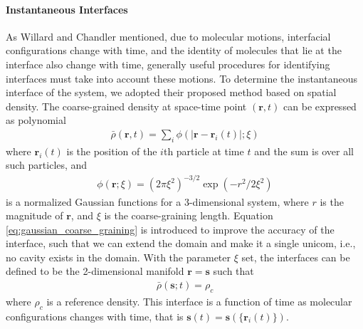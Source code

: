 \paragraph{Instantaneous Interfaces}\label{para:II}
As Willard and Chandler mentioned, due to molecular motions, interfacial configurations
change with time, and the identity of molecules that lie at the interface also change with time, generally useful procedures for
identifying interfaces must take into account these motions. \cite{Willard2010} 
To determine the instantaneous interface of the system, we adopted their proposed method based on spatial density.
The coarse-grained density at space-time point $(\mathbf{r},t)$ can be expressed as polynomial
\begin{eqnarray}
\bar{\rho}(\mathbf{r}, t)=\sum_{i} \phi(|\mathbf{r}-\mathbf{r}_{i}(t)|; \xi) 
\end{eqnarray}
where ${\mathbf{r}}_i(t)$ is the position of the $i$th particle at time $t$ and the sum is over all such particles, and 
\begin{eqnarray}
\phi(\mathbf{r};\xi)=(2 \pi \xi^{2})^{-3/ 2} \exp (-r^{2} / 2 \xi^{2}) 
\label{eq:gaussian_coarse_graining}
\end{eqnarray} 
is a normalized Gaussian functions for a 3-dimensional system, where $r$ is the magnitude of ${\mathbf r}$, and $\xi$ is the coarse-graining length.
Equation \ref{eq:gaussian_coarse_graining} is introduced to improve the accuracy of the interface, such that we can extend the domain and make it a single unicom,
i.e., no cavity exists in the domain.
With the parameter $\xi$ set, the interfaces can be defined to be the 2-dimensional manifold ${\mathbf r} = {\mathbf s}$ such that
\begin{eqnarray}
\bar\rho(\mathbf{s};t)= \rho_c 
\label{eq:rho_c}
\end{eqnarray} 
where $\rho_c$ is a reference density. This interface is a function of time as molecular configurations changes with time, that is 
${\mathbf s}(t) = {\mathbf s}(\{{\mathbf r}_i(t)\})$. 

